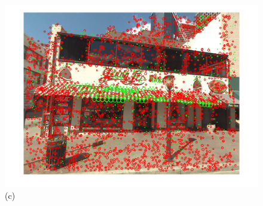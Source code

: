 \begin{figure}
\begin{minipage}{\wii}
            \centering
            \includegraphics[width=\linewidth]{imgs/wVS3q/2882/cftrs.jpg}
            \newline
            (c)
          \end{minipage} 

\end{figure}
